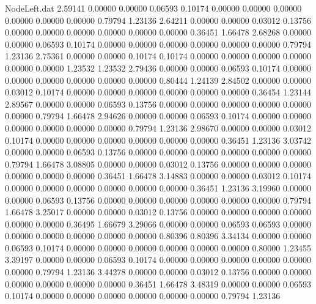 \begin{filecontents}{NodeLeft.dat}
   2.59141    0.00000    0.00000     0.06593    0.10174    0.00000    0.00000    0.00000    0.00000    0.00000    0.00000    0.79794    1.23136
   2.64211    0.00000    0.00000     0.03012    0.13756    0.00000    0.00000    0.00000    0.00000    0.00000    0.00000    0.36451    1.66478
   2.68268    0.00000    0.00000     0.06593    0.10174    0.00000    0.00000    0.00000    0.00000    0.00000    0.00000    0.79794    1.23136
   2.75361    0.00000    0.00000     0.10174    0.10174    0.00000    0.00000    0.00000    0.00000    0.00000    0.00000    1.23532    1.23532
   2.79436    0.00000    0.00000     0.06593    0.10174    0.00000    0.00000    0.00000    0.00000    0.00000    0.00000    0.80444    1.24139
   2.84502    0.00000    0.00000     0.03012    0.10174    0.00000    0.00000    0.00000    0.00000    0.00000    0.00000    0.36454    1.23144
   2.89567    0.00000    0.00000     0.06593    0.13756    0.00000    0.00000    0.00000    0.00000    0.00000    0.00000    0.79794    1.66478
   2.94626    0.00000    0.00000     0.06593    0.10174    0.00000    0.00000    0.00000    0.00000    0.00000    0.00000    0.79794    1.23136
   2.98670    0.00000    0.00000     0.03012    0.10174    0.00000    0.00000    0.00000    0.00000    0.00000    0.00000    0.36451    1.23136
   3.03742    0.00000    0.00000     0.06593    0.13756    0.00000    0.00000    0.00000    0.00000    0.00000    0.00000    0.79794    1.66478
   3.08805    0.00000    0.00000     0.03012    0.13756    0.00000    0.00000    0.00000    0.00000    0.00000    0.00000    0.36451    1.66478
   3.14883    0.00000    0.00000     0.03012    0.10174    0.00000    0.00000    0.00000    0.00000    0.00000    0.00000    0.36451    1.23136
   3.19960    0.00000    0.00000     0.06593    0.13756    0.00000    0.00000    0.00000    0.00000    0.00000    0.00000    0.79794    1.66478
   3.25017    0.00000    0.00000     0.03012    0.13756    0.00000    0.00000    0.00000    0.00000    0.00000    0.00000    0.36495    1.66679
   3.29066    0.00000    0.00000     0.06593    0.06593    0.00000    0.00000    0.00000    0.00000    0.00000    0.00000    0.80396    0.80396
   3.34134    0.00000    0.00000     0.06593    0.10174    0.00000    0.00000    0.00000    0.00000    0.00000    0.00000    0.80000    1.23455
   3.39197    0.00000    0.00000     0.06593    0.10174    0.00000    0.00000    0.00000    0.00000    0.00000    0.00000    0.79794    1.23136
   3.44278    0.00000    0.00000     0.03012    0.13756    0.00000    0.00000    0.00000    0.00000    0.00000    0.00000    0.36451    1.66478
   3.48319    0.00000    0.00000     0.06593    0.10174    0.00000    0.00000    0.00000    0.00000    0.00000    0.00000    0.79794    1.23136

\end{filecontents}
